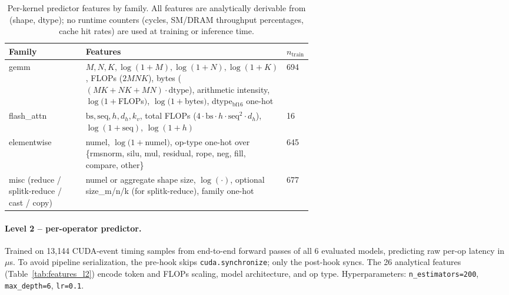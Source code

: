 \begin{table}[htbp]
\caption{Per-kernel predictor features by family. All features are analytically derivable from (shape, dtype); no runtime counters (cycles, SM/DRAM throughput percentages, cache hit rates) are used at training or inference time.}
\label{tab:features_l1}
\centering
\small
\begin{tabular}{@{}lp{0.60\linewidth}l@{}}
\toprule
\textbf{Family} & \textbf{Features} & \textbf{$n_\text{train}$} \\
\midrule
gemm        & $M, N, K, \log(1{+}M), \log(1{+}N), \log(1{+}K)$, FLOPs ($2MNK$), bytes ($(MK{+}NK{+}MN)\cdot\text{dtype}$), arithmetic intensity, $\log(1{+}$FLOPs$)$, $\log(1{+}$bytes$)$, dtype$_{\text{bf16}}$ one-hot & 694 \\
flash\_attn & $\text{bs}, \text{seq}, h, d_h, k_v$, total FLOPs ($4 \cdot \text{bs} \cdot h \cdot \text{seq}^2 \cdot d_h$), $\log(1{+}\text{seq})$, $\log(1{+}h)$ & 16 \\
elementwise & numel, $\log(1{+}$numel$)$, op-type one-hot over \{rmsnorm, silu, mul, residual, rope, neg, fill, compare, other\} & 645 \\
misc (reduce / splitk-reduce / cast / copy) & numel or aggregate shape size, $\log(\cdot)$, optional size\_m/n/k (for splitk-reduce), family one-hot & 677 \\
\bottomrule
\end{tabular}
\end{table}

\paragraph{Level 2 -- per-operator predictor.} Trained on 13{,}144 CUDA-event timing samples from end-to-end forward passes of all 6 evaluated models, predicting raw per-op latency in $\mu$s. To avoid pipeline serialization, the pre-hook skips \texttt{cuda.synchronize}; only the post-hook syncs. The 26 analytical features (Table~\ref{tab:features_l2}) encode token and FLOPs scaling, model architecture, and op type. Hyperparameters: \texttt{n\_estimators=200}, \texttt{max\_depth=6}, \texttt{lr=0.1}.


